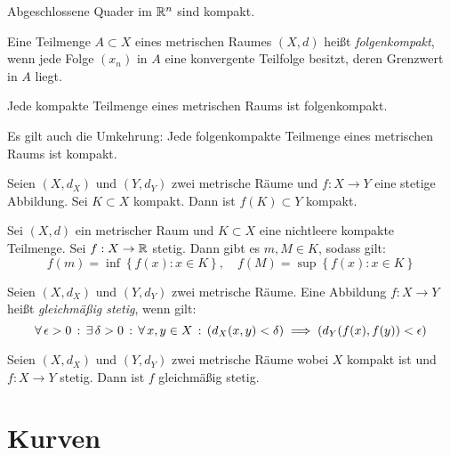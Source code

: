 \documentclass{cheat-sheet}
\begin{document}
\begin{satz}
Abgeschlossene Quader im $\mathbb{R}^n$ sind kompakt.
\end{satz}

\begin{defn}
Eine Teilmenge $A \subset X$ eines metrischen Raumes $(X, d)$ heißt \emph{folgenkompakt}, wenn jede Folge $(x_n)$ in $A$ eine konvergente Teilfolge besitzt, deren Grenzwert in $A$ liegt.
\end{defn}

\begin{satz}
Jede kompakte Teilmenge eines metrischen Raums ist folgenkompakt.
\end{satz}

\begin{bem}
Es gilt auch die Umkehrung: Jede folgenkompakte Teilmenge eines metrischen Raums ist kompakt.
\end{bem}

\begin{satz}
Seien $(X, d_X)$ und $(Y, d_Y)$ zwei metrische Räume und $f : X \to Y$ eine stetige Abbildung. Sei $K \subset X$ kompakt. Dann ist $f(K) \subset Y$ kompakt.
\end{satz}

\begin{satz}
Sei $(X, d)$ ein metrischer Raum und $K \subset X$ eine nichtleere kompakte Teilmenge. Sei $f : X \to \mathbb{R}$ stetig. Dann gibt es $m, M \in K$, sodass gilt:
\[ f(m) = \inf\left\{ f(x) : x \in K \right\},\quad f(M) = \sup\left\{ f(x) : x \in K \right\} \]
\end{satz}

\begin{defn}
Seien $(X, d_X)$ und $(Y, d_Y)$ zwei metrische Räume. Eine Abbildung $f : X \to Y$ heißt \emph{gleichmäßig stetig}, wenn gilt:
\[ \forall \, {\epsilon > 0} \,:\, \exists \, {\delta > 0} \,:\, \forall \, {x, y \in X} \,:\, \left(d_X(x, y) < \delta\right) \implies \left( d_Y(f(x), f(y)) < \epsilon \right) \]
\end{defn}

\begin{samepage} %

\begin{satz}
Seien $(X, d_X)$ und $(Y, d_Y)$ zwei metrische Räume wobei $X$ kompakt ist und $f : X \to Y$ stetig. Dann ist $f$ gleichmäßig stetig.
\end{satz}

\section{Kurven}

\end{samepage}
\end{document}
